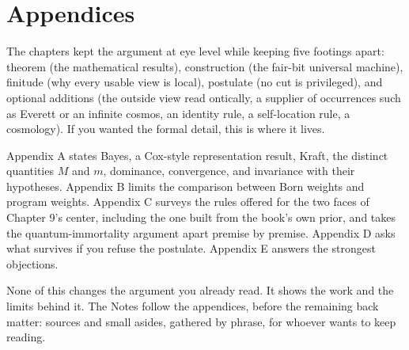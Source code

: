 \chapter*{Appendices}\label{appendices}

The chapters kept the argument at eye level while keeping five footings apart: theorem (the mathematical results), construction (the fair-bit universal machine), finitude (why every usable view is local), postulate (no cut is privileged), and optional additions (the outside view read ontically, a supplier of occurrences such as Everett or an infinite cosmos, an identity rule, a self-location rule, a cosmology). If you wanted the formal detail, this is where it lives.

Appendix A states Bayes, a Cox-style representation result, Kraft, the distinct quantities $M$ and $m$, dominance, convergence, and invariance with their hypotheses. Appendix B limits the comparison between Born weights and program weights. Appendix C surveys the rules offered for the two faces of Chapter 9's center, including the one built from the book's own prior, and takes the quantum-immortality argument apart premise by premise. Appendix D asks what survives if you refuse the postulate. Appendix E answers the strongest objections.

None of this changes the argument you already read. It shows the work and the limits behind it. The Notes follow the appendices, before the remaining back matter: sources and small asides, gathered by phrase, for whoever wants to keep reading.
